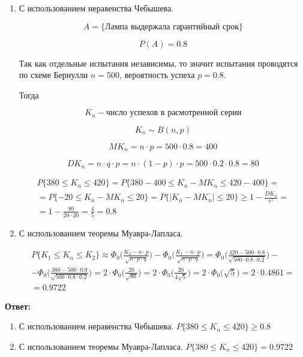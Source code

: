 \documentclass[a4paper,14pt]{extreport} %
\begin{document}
\begin{enumerate}
\item С использованием неравенства Чебышева. 

$$A=\{\text{Лампа выдержала гарантийный срок}\}$$

$$P(A)=0.8$$

Так как отдельные испытания независимы, то значит испытания проводятся по схеме Бернулли $n = 500$, вероятность успеха $p = 0.8$.

Тогда

$$K_n - \text{число успехов в расмотренной серии} $$

$$K_n \sim B(n,p)$$

$$MK_n=n\cdot p=500\cdot 0.8=400$$

$$DK_n=n\cdot q\cdot p=n\cdot(1-p)\cdot p=500\cdot0.2\cdot0.8=80$$

\begin{multline*}
P\{380\le K_n \le 420\}=P\{380-400\le K_n-MK_n\le 420-400\}=\\=P\{-20\le K_n-MK_n\le 20\}=P\{|K_n-MK_n|\le 20\} \ge 1 -\frac{DK_n}{\epsilon^2}=\\=1-\frac{80}{20\cdot 20} =\frac{4}{5}=0.8
\end{multline*}

\item С использованием теоремы Муавра-Лапласа. 

\begin{multline*}
P\{K_1\le K_n\le K_2\}\approx \Phi_0\big(\frac{K_2-n\cdot p}{\sqrt{n\cdot p \cdot q}}\big) - \Phi_0\big(\frac{K_1-n\cdot p}{\sqrt{n\cdot p \cdot q}}\big) = \Phi_0\big(\frac{420-500\cdot 0.8}{\sqrt{500\cdot 0.8 \cdot 0.2}}\big)-\\-\Phi_0\big(\frac{380-500\cdot 0.8}{\sqrt{500\cdot 0.8 \cdot 0.2}}\big)=2\cdot\Phi_0\big(\frac{20}{\sqrt{80}}\big)=2\cdot\Phi_0\big(\frac{20}{4\sqrt{5}}\big)=2\cdot\Phi_0\big(\sqrt{5})=2\cdot 0.4861=\\=0.9722
\end{multline*}

\end{enumerate}

\hfill

\textbf{Ответ:}
\begin{enumerate}
\item С использованием неравенства Чебышева. $P\{380\le K_n \le 420\}\ge0.8$
\item С использованием теоремы Муавра-Лапласа. $P\{380\le K_n \le 420\}=0.9722$
\end{enumerate}
\end{document}
